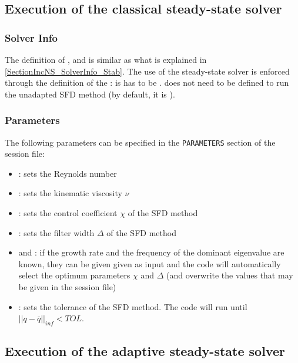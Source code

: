 \subsection{Execution of the classical steady-state solver}

\subsubsection{Solver Info}

The definition of ,   and  is similar as what is explained in \ref{SectionIncNS_SolverInfo_Stab}. The use of the steady-state solver is enforced through the definition of the : is has to be  .  does not need to be defined to run the unadapted SFD method (by default, it is ).

\subsubsection{Parameters}

The following parameters can be specified in the \texttt{PARAMETERS} section of the session file:

\begin{itemize}
\item {}: sets the Reynolds number
\item {}: sets the kinematic viscosity $\nu$
\item {}: sets the control coefficient $\chi$ of the SFD method
\item {}: sets the filter width $\Delta$ of the SFD method
\item {} and : if the growth rate and the frequency of the dominant eigenvalue are known, they can be given given as input and the code will automatically select the optimum parameters $\chi$ and $\Delta$ (and overwrite the values that may be given in the session file)
\item {}: sets the tolerance of the SFD method. The code will run until $||q-\bar{q}||_{inf}<TOL$.
\end{itemize}

\subsection{Execution of the adaptive steady-state solver}

